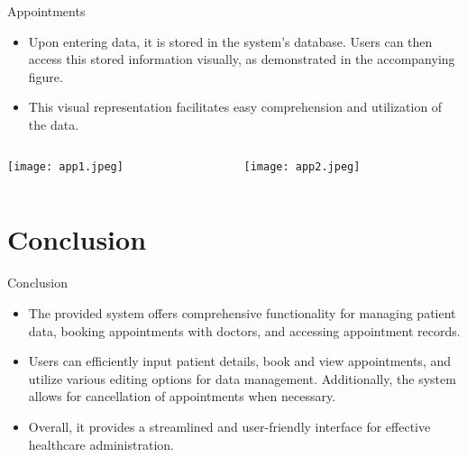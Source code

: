 \documentclass{beamer}
\begin{document}
\begin{frame}{Appointments}
\vspace*{10mm}
\begin{itemize}
 \item Upon entering data, it is stored in the system's database. Users can then access this stored information visually, as demonstrated in the accompanying figure.
 \item This visual representation facilitates easy comprehension and utilization of the data.
 \end{itemize}

 \vspace*{1.0cm}
\begin{columns}
    \begin{column}{5cm}
                 \texttt{[image: app1.jpeg]}
    \end{column}
    \begin{column}{5cm}
                 \texttt{[image: app2.jpeg]} 
    \end{column}
\end{columns}
\end{frame}



\section{Conclusion}
\begin{frame}{Conclusion}
  \begin{itemize}
\vspace*{-3mm}
    \item The provided system offers comprehensive functionality for managing patient data, booking appointments with doctors, and accessing appointment records. 
\vspace*{2mm}
    \item Users can efficiently input patient details, book and view appointments, and utilize various editing options for data management. Additionally, the system allows for cancellation of appointments when necessary.
\vspace*{2mm}
    \item Overall, it provides a streamlined and user-friendly interface for effective healthcare administration.
  \end{itemize}

\end{frame}
\end{document}
